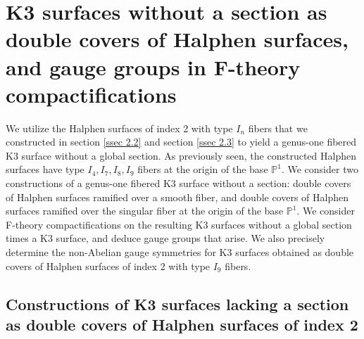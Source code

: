 \documentclass[12pt]{article}
\def\P{\mathbb{P}}
\begin{document}
\section{K3 surfaces without a section as double covers of Halphen surfaces, and gauge groups in F-theory compactifications}
\label{sec 3}
We utilize the Halphen surfaces of index 2 with type $I_n$ fibers that we constructed in section \ref{ssec 2.2} and section \ref{ssec 2.3} to yield a genus-one fibered K3 surface without a global section. As previously seen, the constructed Halphen surfaces have type $I_4, I_7, I_8, I_9$ fibers at the origin of the base $\P^1$. We consider two constructions of a genus-one fibered K3 surface without a section: double covers of Halphen surfaces ramified over a smooth fiber, and double covers of Halphen surfaces ramified over the singular fiber at the origin of the base $\P^1$. We consider F-theory compactifications on the resulting K3 surfaces without a global section times a K3 surface, and deduce gauge groups that arise. We also precisely determine the non-Abelian gauge symmetries for K3 surfaces obtained as double covers of Halphen surfaces of index 2 with type $I_9$ fibers.

\subsection{Constructions of K3 surfaces lacking a section as double covers of Halphen surfaces of index 2}
\label{ssec 3.1}
\end{document}

